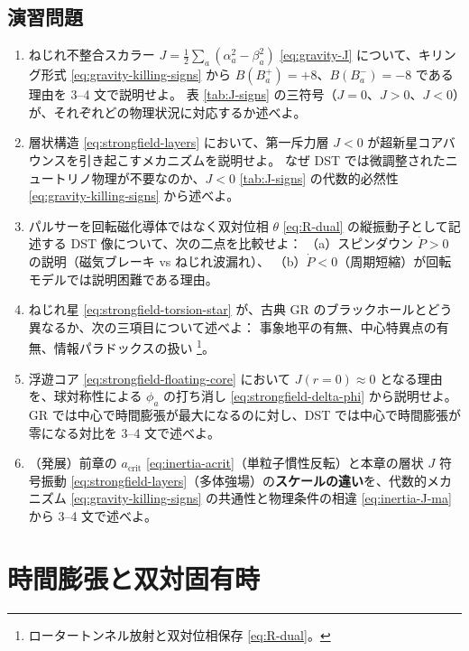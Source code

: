 \documentclass[dvipdfmx,a4paper,oneside]{jsbook}
\numberwithin{equation}{chapter}
\begin{document}
\section*{演習問題}

\begin{enumerate}[leftmargin=2em]
  \item ねじれ不整合スカラー \(J = \tfrac{1}{2}\sum_a(\alpha_a^2 - \beta_a^2)\) \eqref{eq:gravity-J} について、キリング形式 \eqref{eq:gravity-killing-signs} から \(B(B_a^{+}) = +8\)、\(B(B_a^{-}) = -8\) である理由を 3--4 文で説明せよ。
  表 \ref{tab:J-signs} の三符号（\(J = 0\)、\(J > 0\)、\(J < 0\)）が、それぞれどの物理状況に対応するか述べよ。

  \item 層状構造 \eqref{eq:strongfield-layers} において、第一斥力層 \(J < 0\) が超新星コアバウンスを引き起こすメカニズムを説明せよ。
  なぜ DST では微調整されたニュートリノ物理が不要なのか、\(J < 0\) \eqref{tab:J-signs} の代数的必然性 \eqref{eq:gravity-killing-signs} から述べよ。

  \item パルサーを回転磁化導体ではなく双対位相 \(\theta\) \eqref{eq:R-dual} の縦振動子として記述する DST 像について、次の二点を比較せよ：
  （a）スピンダウン \(\dot{P} > 0\) の説明（磁気ブレーキ vs ねじれ波漏れ）、
  （b）\(\dot{P} < 0\)（周期短縮）が回転モデルでは説明困難である理由。

  \item ねじれ星 \eqref{eq:strongfield-torsion-star} が、古典 GR のブラックホールとどう異なるか、次の三項目について述べよ：
  事象地平の有無、中心特異点の有無、情報パラドックスの扱い \footnote{ロータートンネル放射と双対位相保存 \eqref{eq:R-dual}。}。

  \item 浮遊コア \eqref{eq:strongfield-floating-core} において \(J(r = 0) \approx 0\) となる理由を、球対称性による \(\phi_a\) の打ち消し \eqref{eq:strongfield-delta-phi} から説明せよ。
  GR では中心で時間膨張が最大になるのに対し、DST では中心で時間膨張が零になる対比を 3--4 文で述べよ。

  \item （発展）前章の \(a_{\mathrm{crit}}\) \eqref{eq:inertia-acrit}（単粒子慣性反転）と本章の層状 \(J\) 符号振動 \eqref{eq:strongfield-layers}（多体強場）の\textbf{スケールの違い}を、代数的メカニズム \eqref{eq:gravity-killing-signs} の共通性と物理条件の相違 \eqref{eq:inertia-J-ma} から 3--4 文で述べよ。
\end{enumerate}

\chapter{時間膨張と双対固有時}
\end{document}

